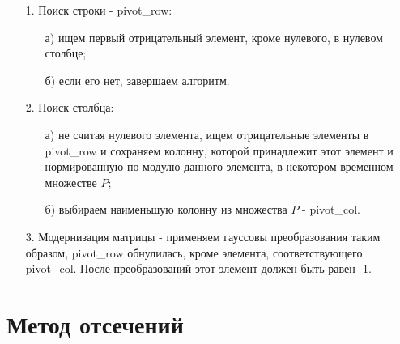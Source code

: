 \documentclass[a4paper,14pt,russian]{extreport}
\begin{document}
  \begin{enumerate}
  \item[1.] Поиск строки - pivot\_row:
    \begin{enumerate}
    \item[а)] ищем первый отрицательный элемент, кроме нулевого, в нулевом столбце;
    \item[б)] если его нет, завершаем алгоритм.
    \end{enumerate}
  \item[2.] Поиск столбца:
    \begin{enumerate}
    \item[а)] не считая нулевого элемента, ищем отрицательные элементы в pivot\_row и сохраняем колонну, которой принадлежит этот элемент и нормированную по модулю данного элемента, в некотором временном множестве $P$;
    \item[б)] выбираем наименьшую колонну из множества $P$ - pivot\_col.
    \end{enumerate}
  \item[3.] Модернизация матрицы - применяем гауссовы преобразования таким образом, pivot\_row обнулилась, кроме элемента, соответствующего pivot\_col. После преобразований этот элемент должен быть равен -1.
  \end{enumerate}


\section{Метод отсечений}
\end{document}
